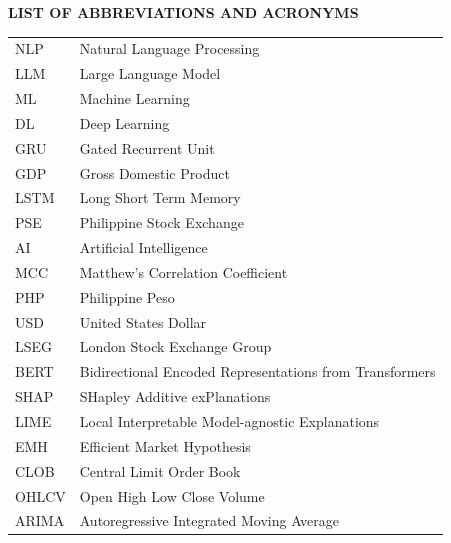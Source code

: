 \documentclass[stu,floatsintext]{apa7}
\begin{document}

\newpage
{}
{}
\begin{center}
{\bfseries LIST OF ABBREVIATIONS AND ACRONYMS}
\end{center}
\vspace{0.3in}
\begin{center}
\begin{tabular}{@{}ll@{}}
NLP & Natural Language Processing \\
LLM & Large Language Model \\
ML & Machine Learning \\
DL & Deep Learning \\
GRU & Gated Recurrent Unit \\
GDP & Gross Domestic Product \\
LSTM & Long Short Term Memory \\
PSE & Philippine Stock Exchange \\
AI & Artificial Intelligence \\
MCC & Matthew's Correlation Coefficient \\
PHP & Philippine Peso \\
USD & United States Dollar \\
LSEG & London Stock Exchange Group \\
BERT & Bidirectional Encoded Representations from Transformers \\
SHAP & SHapley Additive exPlanations \\
LIME & Local Interpretable Model-agnostic Explanations \\ 
EMH & Efficient Market Hypothesis \\
CLOB & Central Limit Order Book \\
OHLCV & Open High Low Close Volume \\
ARIMA & Autoregressive Integrated Moving Average
\end{tabular}
\end{center}
\end{document}
